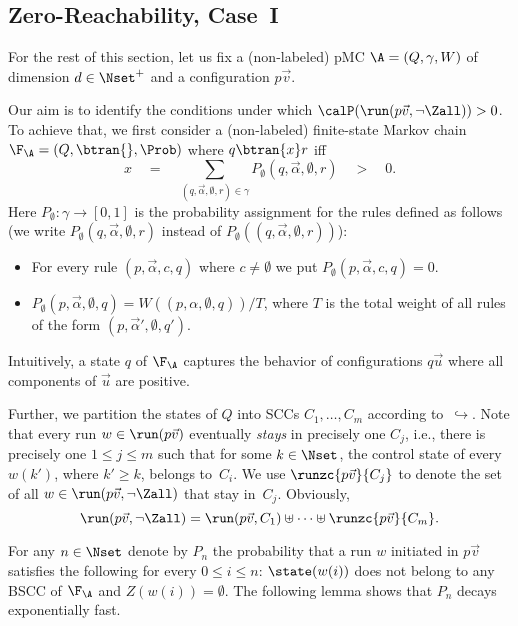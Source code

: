 \subsection{Zero-Reachability, Case~I}
\label{sec-case1}

For the rest of this section, let us fix a (non-labeled) 
pMC $\A = (Q,\gamma,W)$ of dimension $d \in \Nset^+$ and 
a configuration $p\vec{v}$. 

Our aim is to identify the conditions under which
$\calP(\run(p\vec{v},\neg\Zall)) > 0$. To achieve that, we 
first consider a (non-labeled) finite-state Markov chain
$\F_{\A} = (Q,\btran{},\Prob)$ where $q \btran{x} r$ iff 
\[
  x \quad = \quad 
  \sum_{(q,\vec{\alpha},\emptyset,r) \in \gamma} P_\emptyset(q,\vec{\alpha},\emptyset,r) 
  \quad > \quad 0.
\]
Here $P_\emptyset : \gamma \rightarrow [0,1]$ is the probability assignment
for the rules defined as follows (we write $P_\emptyset(q,\vec{\alpha},\emptyset,r)$
instead of $P_\emptyset((q,\vec{\alpha},\emptyset,r))$):
\begin{itemize}
\item For every rule $(p,\vec{\alpha},c,q)$ where $c \neq \emptyset$
  we put $P_\emptyset(p,\vec{\alpha},c,q) = 0$.
\item $P_\emptyset(p,\vec{\alpha},\emptyset,q) = W((p,\alpha,\emptyset,q))/T$,
  where $T$ is the total weight of all rules of the form
  $(p,\vec{\alpha}',\emptyset,q')$.
\end{itemize}
Intuitively, a state $q$ of $\F_{\A}$ captures the behavior of 
configurations $q \vec{u}$ where all components of $\vec{u}$ are
positive. 

Further, we partition the states of 
$Q$ into SCCs $C_1,\ldots,C_m$ according to~$\hookrightarrow$. Note that every 
run $w \in \run(p\vec{v})$ eventually \emph{stays} in precisely
one $C_j$, i.e., there is precisely one $1\leq j \leq m$ 
such that for some $k \in \Nset$, the control state of every $w(k')$,
where $k' \geq k$, belongs to~$C_i$. 
We use $\runzc{p\vec{v}}{C_j}$ to denote 
the set of all $w \in \run(p\vec{v},\neg\Zall)$ that stay in~$C_j$. 
Obviously,
\[
  \run(p\vec{v},\neg\Zall) = 
  \run(p\vec{v},C_1) \uplus \cdots \uplus \runzc{p\vec{v}}{C_m}.
\]

  For any $n \in \Nset$ denote by $P_n$ the probability that a run $w$ initiated in $p\vec{v}$ satisfies the following for every $0\leq i \leq n$: $\state(w(i))$ does not belong to any BSCC of $\F_\A$ and $Z(w(i))=\emptyset$. The following lemma shows that $P_n$ decays exponentially fast.

